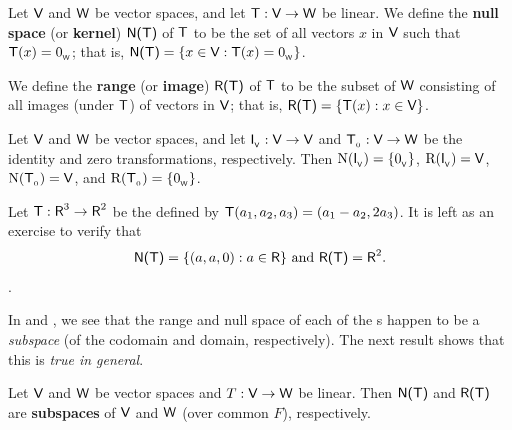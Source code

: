 \begin{definition} \label{def 2.2}
Let \(\textsf{V}\) and \(\textsf{W}\) be vector spaces, and let \(\textsf{T} : \textsf{V} \to \textsf{W}\) be linear.
We define the \textbf{null space} (or \textbf{kernel}) \(\textsf{N(T)}\) of \(\textsf{T}\) to be the set of all vectors \(x\) in \(\textsf{V}\) such that \(\textsf{T}(x) = 0_{_{\textsf{W}}}\);
that is, \(\textsf{N(T)} = \{ x \in \textsf{V} : \textsf{T}(x) = 0_{_{\textsf{W}}} \}\).

We define the \textbf{range} (or \textbf{image}) \(\textsf{R(T)}\) of \(\textsf{T}\) to be the subset of \(\textsf{W}\) consisting of all images (under \(\textsf{T}\)) of vectors in \(\textsf{V}\);
that is, \(\textsf{R(T)} = \{ \textsf{T}(x) : x \in \textsf{V} \}\).
\end{definition}

\begin{example} \label{example 2.1.8}
Let \(\textsf{V}\) and \(\textsf{W}\) be vector spaces, and let \(\textsf{I}_{_{\textsf{V}}} : \textsf{V} \to \textsf{V}\) and \(\textsf{T}_{_0} : \textsf{V} \to \textsf{W}\) be the identity and zero transformations, respectively. Then \(\mathrm{N}(\textsf{I}_{_{\textsf{V}}}) = \{ 0_{_{\textsf{V}}} \}\), \(\mathrm{R}(\textsf{I}_{_{\textsf{V}}}) = \textsf{V}\), \(\mathrm{N}(\textsf{T}_{_0}) = \textsf{V}\), and \(\mathrm{R}(\textsf{T}_{_0}) = \{ 0_{_{\textsf{W}}} \}\).
\end{example}

\begin{example} \label{example 2.1.9}
Let \(\textsf{T} : \textsf{R}^3 \to \textsf{R}^2\) be the \LTRAN{} defined by \(\textsf{T}(a_1, a_2, a_3) = (a_1 - a_2, 2a_3)\).
It is left as an exercise to verify that
\[
    \textsf{N(T)} = \{ (a, a, 0) : a \in \textsf{R} \} \text{ and } \textsf{R(T)} = \textsf{R}^2.
\].
\end{example}

\begin{remark} \label{remark 2.1.4}
In  and , we see that the range and null space of each of the \LTRAN{}s happen to be a \emph{subspace} (of the codomain and domain, respectively).
The next result shows that this is \emph{true in general}.
\end{remark}

\begin{theorem} \label{thm 2.1}
Let \(\textsf{V}\) and \(\textsf{W}\) be vector spaces and \(T : \textsf{V} \to \textsf{W}\) be linear.
Then \(\textsf{N(T)}\) and \(\textsf{R(T)}\) are \textbf{subspaces} of \(\textsf{V}\) and \(\textsf{W}\) (over common \(F\)), respectively.
\end{theorem}

